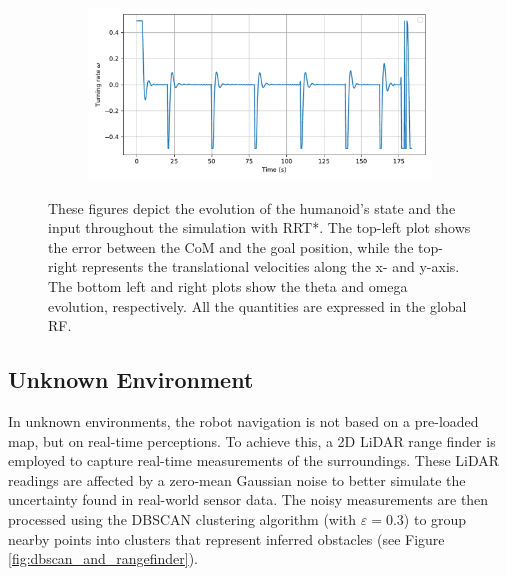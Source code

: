 \begin{figure}[H]
\begin{subfigure}{0.45\linewidth}
    \end{subfigure}
    \begin{subfigure}{0.45\linewidth}
        \centering
        \includegraphics[width=\linewidth]{figures/Simulations/sim_rrt/evolution_3.pdf}
    \end{subfigure}
    \caption{These figures depict the evolution of the humanoid's state and the input throughout the simulation with RRT*. The top-left plot shows the error between the CoM and the goal position, while the top-right represents the translational velocities along the x- and y-axis. The bottom left and right plots show the theta and omega evolution, respectively. All the quantities are expressed in the global RF.}
    \label{fig:sim_rrt_evol}
\end{figure}




\subsection{Unknown Environment}
In unknown environments, the robot navigation is not based on a pre-loaded map, but on real-time perceptions.
To achieve this, a 2D LiDAR range finder is employed to capture real-time measurements of the surroundings.
These LiDAR readings are affected by a zero-mean Gaussian noise to better simulate the uncertainty found in real-world sensor data.
The noisy measurements are then processed using the DBSCAN clustering algorithm (with $\varepsilon = 0.3$) to group
nearby points into clusters that represent inferred obstacles (see Figure \ref{fig:dbscan_and_rangefinder}).

